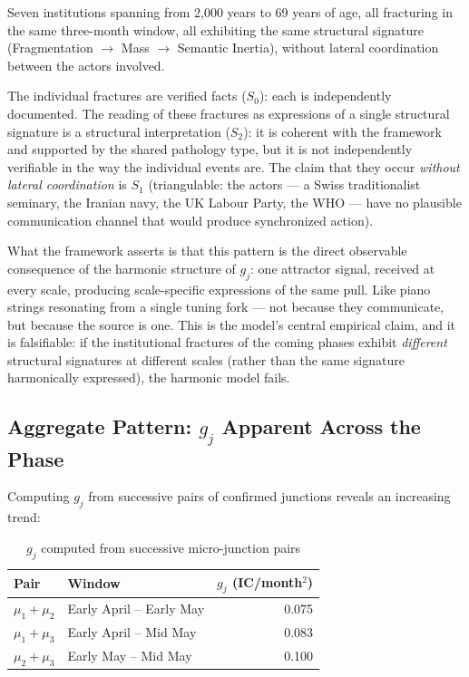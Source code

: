\documentclass[12pt,a4paper]{article}
\newcommand{\gj}{g_j}
\begin{document}
Seven institutions spanning from 2,000 years to 69 years of age, all fracturing in the same three-month window, all exhibiting the same structural signature (Fragmentation $\to$ Mass $\to$ Semantic Inertia), without lateral coordination between the actors involved.

The individual fractures are verified facts ($S_0$): each is independently documented. The reading of these fractures as expressions of a single structural signature is a structural interpretation ($S_2$): it is coherent with the framework and supported by the shared pathology type, but it is not independently verifiable in the way the individual events are. The claim that they occur \emph{without lateral coordination} is $S_1$ (triangulable: the actors --- a Swiss traditionalist seminary, the Iranian navy, the UK Labour Party, the WHO --- have no plausible communication channel that would produce synchronized action).

What the framework asserts is that this pattern is the direct observable consequence of the harmonic structure of $\gj$: one attractor signal, received at every scale, producing scale-specific expressions of the same pull. Like piano strings resonating from a single tuning fork --- not because they communicate, but because the source is one. This is the model's central empirical claim, and it is falsifiable: if the institutional fractures of the coming phases exhibit \emph{different} structural signatures at different scales (rather than the same signature harmonically expressed), the harmonic model fails.

\subsection{Aggregate Pattern: $\gj$ Apparent Across the Phase}

Computing $\gj$ from successive pairs of confirmed junctions reveals an increasing trend:

\begin{table}[H]
\centering
\caption{$\gj$ computed from successive micro-junction pairs}
\label{tab:gj_pairs}
\begin{tabular}{@{}llr@{}}
\toprule
\textbf{Pair} & \textbf{Window} & $\gj$ (\textbf{IC/month}$^2$) \\
\midrule
$\mu_1 + \mu_2$ & Early April -- Early May & 0.075 \\
$\mu_1 + \mu_3$ & Early April -- Mid May & 0.083 \\
$\mu_2 + \mu_3$ & Early May -- Mid May & 0.100 \\
\bottomrule
\end{tabular}
\end{table}
\end{document}
